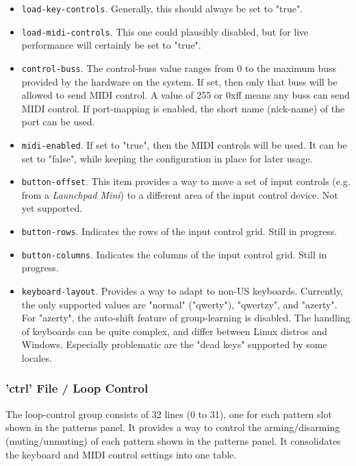    \begin{itemize}
      \item \texttt{load-key-controls}.
         Generally, this should always be set to "true".
      \item \texttt{load-midi-controls}.
         This one could plausibly disabled, but for live performance will
         certainly be set to "true".
      \item \texttt{control-buss}.
         The control-buss value ranges from 0 to the maximum buss provided by
         the hardware on the system. If set, then only that buss will be allowed
         to send MIDI control.  A value of 255 or 0xff means any buss can send
         MIDI control. If port-mapping is enabled, the short name (nick-name) of
         the port can be used.
      \item \texttt{midi-enabled}.
         If set to "true", then the MIDI controls will be used.
         It can be set to "false", while keeping the configuration in place
         for later usage.
      \item \texttt{button-offset}.
         This item provides a way to move a set of input controls (e.g. from a
         \textsl{Launchpad Mini}) to a different area of the input control
         device.  Not yet supported.
      \item \texttt{button-rows}.
         Indicates the rows of the input control grid.
         Still in progress.
      \item \texttt{button-columns}.
         Indicates the columns of the input control grid.
         Still in progress.
      \item \texttt{keyboard-layout}.
         Provides a way to adapt to non-US keyboards.
         Currently, the only supported values are "normal" ("qwerty"), "qwertzy",
         and "azerty".
         For "azerty", the auto-shift feature of group-learning is disabled.
         The handling of keyboards can be quite complex, and differ between
         Linux distros and Windows.
         Especially problematic are the "dead keys" supported by some locales.
   \end{itemize}

\subsubsection{'ctrl' File / Loop Control}
\label{subsubsec:configuration_ctrl_loop_control}

   The loop-control group consists of 32 lines (0 to 31), one for each
   pattern slot shown in the patterns panel.
   It provides a way to control the arming/disarming (muting/unmuting) of
   each pattern shown in the patterns panel.
   It consolidates the keyboard and MIDI control settings into one table.

